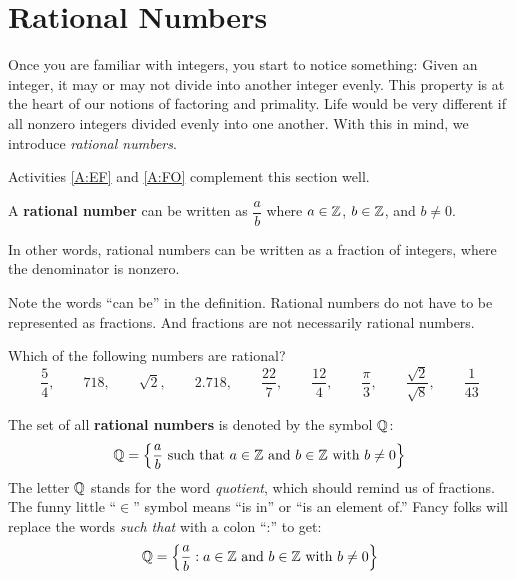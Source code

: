 \newpage
\section{Rational Numbers}

Once you are familiar with integers, you start to notice something:
Given an integer, it may or may not divide into another integer
evenly. This property is at the heart of our notions of factoring and
primality. Life would be very different if all nonzero integers
divided evenly into one another. With this in mind, we introduce
\textit{rational numbers}.  
\begin{activitynote}
Activities \ref{A:EF} and \ref{A:FO} complement this section well.  
\end{activitynote}



\begin{definition} 
A \textbf{rational number} can be written as $\dfrac{a}{b}$ where $a\in\mathbb Z$, $b\in\mathbb Z$, and $b\ne 0$.
\end{definition}

In other words, rational numbers can be written as a fraction of integers, where the denominator is nonzero.
\begin{warning}
Note the words ``can be'' in the definition.  Rational numbers do not have to be represented as fractions.  And fractions are not necessarily rational numbers.  
\end{warning}

\begin{question}
Which of the following numbers are rational?
$$\frac{5}{4}, \qquad 718, \qquad \sqrt{2}, \qquad 2.718, \qquad \frac{22}{7}, \qquad \frac{12}{4}, \qquad \frac{\pi}{3}, \qquad \frac{\sqrt{2}}{\sqrt{8}}, \qquad \frac{1}{43}$$
\end{question}

The set of all \textbf{rational numbers} is denoted by the symbol $\mathbb Q$: 
\[
      \Q = \left\{\frac{a}{b}\text{ such that $a\in\Z$ and $b\in\Z$ with $b\ne 0$}\right\}\index{Q@$\Q$}\index{e@$\in$}
\]
The letter $\mathbb Q$ stands for the word \textit{quotient}, which should remind us of
fractions.   The funny little ``$\in$'' symbol means ``is in'' or ``is an element of.'' Fancy folks will replace the words \textit{such that} with a colon
``:'' to get:
\[
 \mathbb Q = \left\{\frac{a}{b}:\text{$a\in\mathbb Z$ and $b\in\mathbb Z$ with $b\ne 0$}\right\}
\]


